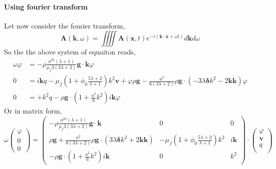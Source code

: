 \paragraph*{Using fourier transform}
Let now consider the fourier transform, 
\begin{equation}
    \textbf{A}(\textbf{k},\omega)
    =
    \iiiint
    \textbf{A}(\textbf{x},t)
    e^{-i(\textbf{k}\cdot \textbf{x} + \omega t)}
    d\textbf{k}d\omega
\end{equation}
So the the above system of equaiton reads, 
\begin{align}
    \omega \varphi &= - \rho \frac{a^22(\lambda+1)}{\mu_f 3(3\lambda+2)}\textbf{g}\cdot \textbf{k} \varphi \\
    0 &= 
    i \textbf{k}  q
    - \mu_f (1+\phi_0 \frac{5\lambda +2}{\lambda+1}) k^2\textbf{v}
    + \varphi \rho \textbf{g}
    -  \frac{a^2}{ 6(3\lambda+2)} \rho \textbf{g}\cdot (
    - 3\lambda \bm\delta k^2   
    -  2 \textbf{kk}
    )\varphi\\
    0 &= 
    + k^2 q
    - \rho \textbf{g} \cdot(1 + \frac{a^2}{6}k^2) i\textbf{k} \varphi 
\end{align}
Or in matrix form, 
\begin{equation}
    \omega
    \begin{pmatrix}
        \varphi\\
        0\\
        0
    \end{pmatrix}
    =
    \begin{pmatrix}
        - \rho \frac{a^22(\lambda+1)}{\mu_f 3(3\lambda+2)}\textbf{g}\cdot \textbf{k}
        & 0 & 0 \\
        \rho \textbf{g}
        + \frac{a^2}{ 6(3\lambda+2)} \rho \textbf{g}\cdot (
        3\lambda \bm\delta k^2   
        +  2 \textbf{kk}
        )
        &
        - \mu_f (1+\phi_0 \frac{5\lambda +2}{\lambda+1}) k^2
        &
        i \textbf{k}  \\
        - \rho \textbf{g} \cdot(1 + \frac{a^2}{6}k^2) i\textbf{k}  
        &
        0
        &k^2 
    \end{pmatrix}
    \cdot 
    \begin{pmatrix}
        \varphi\\    
        \textbf{v}\\    
        q\\    
    \end{pmatrix}
\end{equation}

